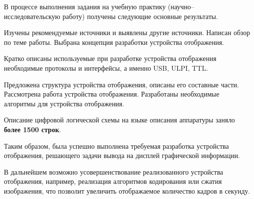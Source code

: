 \Conclusion

В процессе выполнения задания на учебную практику (научно–исследовательскую работу) получены следующие основные результаты.

Изучены рекомендуемые источники и выявлены другие источники. Написан обзор по теме работы. Выбрана концепция разработки устройства отображения.

Кратко описаны используемые при разработке устройства отображения необходимые протоколы и интерфейсы, а именно USB, ULPI, TTL.

Предложена структура устройства отображения, описаны его составные части. Рассмотрена работа устройства отображения. Разработаны необходимые алгоритмы для устройства отображения.

Описание цифровой логической схемы на языке описания аппаратуры заняло \textbf{более 1500 строк}.

Таким образом, была успешно выполнена требуемая разработка устройства отображения, решающего задачи вывода на дисплей графической информации.

В дальнейшем возможно усовершенствование реализованного устройства отображения, например, реализация алгоритмов кодирования или сжатия изображения, что позволит увеличить отображаемое количество кадров в секунду.


